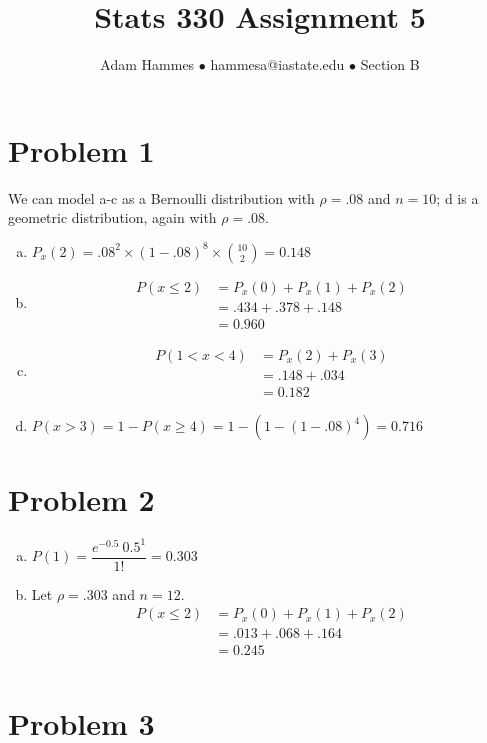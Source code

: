 \documentclass[11pt]{article}
\begin{document}
\title{Stats 330 Assignment 5}
\author{Adam Hammes $\bullet$ hammesa@iastate.edu $\bullet$ Section B}
\maketitle

\section*{Problem 1}
We can model a-c as a Bernoulli distribution with $\rho = .08$ and $n=10$; d is a geometric distribution, again with $\rho = .08$.

\begin{enumerate}[(a)]
	\item $P_x(2) = .08^2 \times (1-.08)^8 \times \binom{10}{2} = 0.148$
	\item
		\begin{align*}
			P(x \leq 2)&= P_x(0) + P_x(1) + P_x(2) \\
			&= .434 + .378 + .148 \\
			&=0 .960
		\end{align*}
	\item
		\begin{align*}
			P( 1 < x < 4) &= P_x(2) + P_x(3) \\
			&= .148 + .034 \\
			&= 0.182
		\end{align*}
	\item $P( x > 3 ) =1- P( x \geq 4) = 1-(1- (1-.08)^4) = 0.716$
\end{enumerate}

\section*{Problem 2}

\begin{enumerate}[(a)]
	\item $P(1) = \dfrac{e^{-0.5}\ 0.5 ^ 1}{1!} = 0.303$
	\item Let $\rho = .303$ and $n =12$.
		\begin{align*}
			P(x \leq 2) &= P_x(0) + P_x(1) + P_x(2) \\
			&= .013 + .068 + .164 \\
			&= 0.245 \\
		\end{align*}
\end{enumerate}

\section*{Problem 3}
\end{document}
